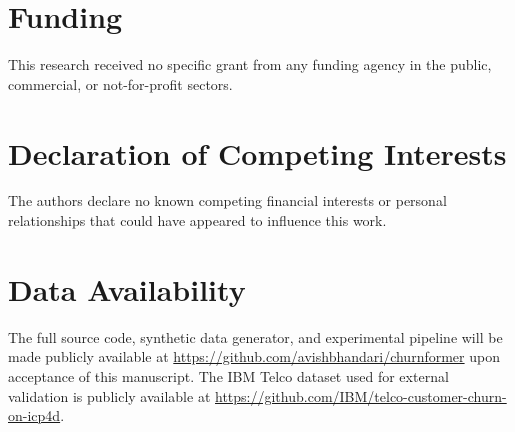 \documentclass[review, 12pt]{elsarticle}
\begin{document}
\section*{Funding}
This research received no specific grant from any funding agency in the
public, commercial, or not-for-profit sectors.

\section*{Declaration of Competing Interests}
The authors declare no known competing financial interests or personal
relationships that could have appeared to influence this work.

\section*{Data Availability}
The full source code, synthetic data generator, and experimental pipeline
will be made publicly available at
\url{https://github.com/avishbhandari/churnformer} upon acceptance of this
manuscript.
The IBM Telco dataset used for external validation is publicly available at
\url{https://github.com/IBM/telco-customer-churn-on-icp4d}.



\end{document}
